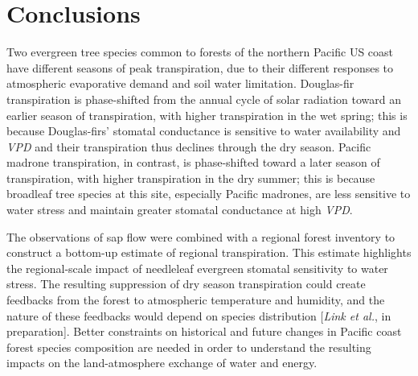 \section{Conclusions}
Two evergreen tree species common to forests of the northern Pacific US coast have different seasons of peak transpiration, due to their different responses to atmospheric evaporative demand and soil water limitation.  Douglas-fir transpiration is phase-shifted from the annual cycle of solar radiation toward an earlier season of transpiration, with higher transpiration in the wet spring; this is because Douglas-firs' stomatal conductance is sensitive to water availability and \textit{VPD} and their transpiration thus declines through the dry season.  Pacific madrone transpiration, in contrast, is phase-shifted toward a later season of transpiration, with higher transpiration in the dry summer; this is because broadleaf tree species at this site, especially Pacific madrones, are less sensitive to water stress and maintain greater stomatal conductance at high \textit{VPD}.

The observations of sap flow were combined with a regional forest inventory to construct a bottom-up estimate of regional transpiration.  This estimate highlights the regional-scale impact of needleleaf evergreen stomatal sensitivity to water stress.  The resulting suppression of dry season transpiration could create feedbacks from the forest to atmospheric temperature and humidity, and the nature of these feedbacks would depend on species distribution [\textit{Link et al.}, in preparation].  Better constraints on historical and future changes in Pacific coast forest species composition are needed in order to understand the resulting impacts on the land-atmosphere exchange of water and energy.
